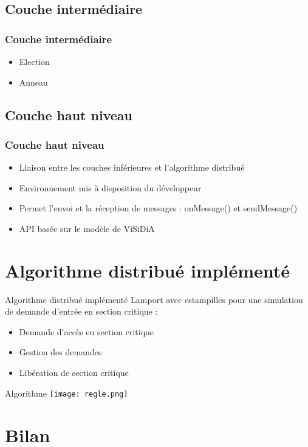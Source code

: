 \documentclass{beamer}
\begin{document}
      \subsection{Couche intermédiaire}
      \begin{frame}
	  \frametitle{Couche intermédiaire}
	  \begin{itemize}
	      \item Election
	      \item Anneau
	  \end{itemize}
      \end{frame}
      \subsection{Couche haut niveau}
      \begin{frame}
	  \frametitle{Couche haut niveau}
	  \begin{itemize}
	      \item Liaison entre les couches inférieures et l'algorithme distribué
	      \item Environnement mis à disposition du développeur
	      \item Permet l'envoi et la réception de messages : onMessage() et sendMessage()
	      \item API basée sur le modèle de ViSiDiA
	  \end{itemize}
      \end{frame}
    \section{Algorithme distribué implémenté}
    \begin{frame}{Algorithme distribué implémenté}
    Lamport avec estampilles pour une simulation de demande d’entrée en section critique :
        \begin{itemize}
            \item Demande d'accès en section critique
            \item Gestion des demandes
            \item Libération de section critique
        \end{itemize}
    \end{frame}
    \begin{frame}{Algorithme}
        \texttt{[image: regle.png]}
    \end{frame}
    \section{Bilan}
    
\end{document}
